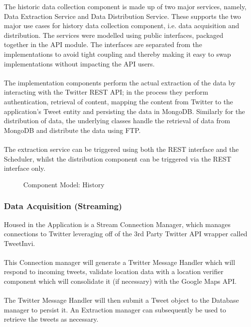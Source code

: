 \documentclass[12pt]{article} %
\begin{document}
	The historic data collection component is made up of two major services, namely, Data Extraction Service and Data Distribution Service. These supports the two major use cases for history data collection component, i.e. data acquisition and distribution. The services were modelled using public interfaces, packaged together in the API module. The interfaces are separated from the implementations to avoid tight coupling and thereby making it easy to swap implementations without impacting the API users.
	\\
	\\
	The implementation components perform the actual extraction of the data by interacting with the Twitter REST API; in the process they perform authentication, retrieval of content, mapping the content from Twitter to the application’s Tweet entity and persisting the data in MongoDB. Similarly for the distribution of data, the underlying classes handle the retrieval of data from MongoDB and distribute the data using FTP.
	\\
	\\
	The extraction service can be triggered using both the REST interface and the Scheduler, whilst the distribution component can be triggered via the REST interface only.
	
	
		\begin{figure}[H] %
			\caption{Component Model: History}
			\label{fig:speciation}
		\end{figure}
	
	\subsubsection{Data Acquisition (Streaming)}
	
	Housed in the Application is a Stream Connection Manager, which manages connections to Twitter leveraging off of the 3rd Party Twitter API wrapper called TweetInvi.\\
	\
	\\
	This Connection manager will generate a Twitter Message Handler which will respond to incoming tweets, validate location data with a location verifier component which will consolidate it (if necessary) with the Google Maps API. \\
	\
	\\
	The Twitter Message Handler will then submit a Tweet object to the Database manager to persist it. An Extraction manager can subsequently be used to retrieve the tweets as necessary.
	
\end{document}
